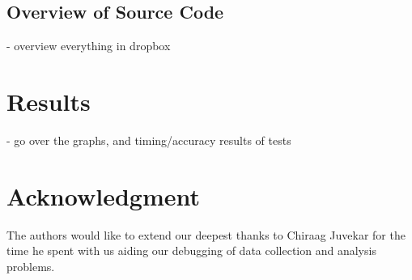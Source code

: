 \documentclass[journal]{ieee_style}
\begin{document}
\subsection{Overview of Source Code}
- overview everything in dropbox

\section{Results}
- go over the graphs, and timing/accuracy results of tests



\section*{Acknowledgment}
The authors would like to extend our deepest thanks to Chiraag Juvekar for the time he spent with us aiding our debugging of data collection and analysis problems. 


\end{document}
